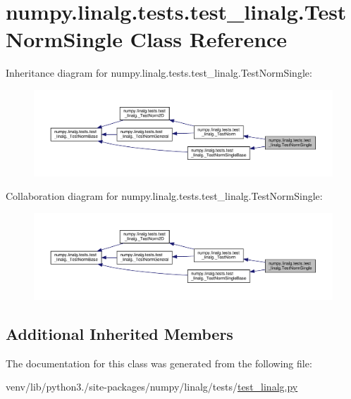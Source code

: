 \hypertarget{classnumpy_1_1linalg_1_1tests_1_1test__linalg_1_1TestNormSingle}{}\section{numpy.\+linalg.\+tests.\+test\+\_\+linalg.\+Test\+Norm\+Single Class Reference}
\label{classnumpy_1_1linalg_1_1tests_1_1test__linalg_1_1TestNormSingle}


Inheritance diagram for numpy.\+linalg.\+tests.\+test\+\_\+linalg.\+Test\+Norm\+Single\+:
\nopagebreak
\begin{figure}[H]
\begin{center}
\leavevmode
\includegraphics[width=350pt]{classnumpy_1_1linalg_1_1tests_1_1test__linalg_1_1TestNormSingle__inherit__graph}
\end{center}
\end{figure}


Collaboration diagram for numpy.\+linalg.\+tests.\+test\+\_\+linalg.\+Test\+Norm\+Single\+:
\nopagebreak
\begin{figure}[H]
\begin{center}
\leavevmode
\includegraphics[width=350pt]{classnumpy_1_1linalg_1_1tests_1_1test__linalg_1_1TestNormSingle__coll__graph}
\end{center}
\end{figure}
\subsection*{Additional Inherited Members}


The documentation for this class was generated from the following file\+:\begin{DoxyCompactItemize}
\item 
venv/lib/python3./site-\/packages/numpy/linalg/tests/\hyperlink{test__linalg_8py}{test\+\_\+linalg.\+py}\end{DoxyCompactItemize}
